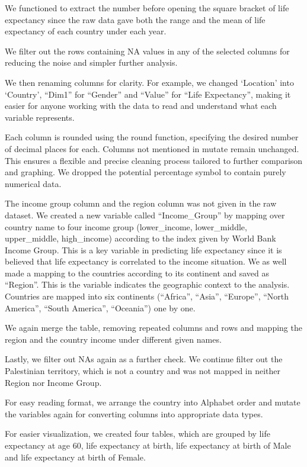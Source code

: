 \documentclass[
  letterpaper,
  DIV=11,
  numbers=noendperiod]{scrartcl}
\begin{document}
We functioned to extract the number before opening the square bracket of
life expectancy since the raw data gave both the range and the mean of
life expectancy of each country under each year.

We filter out the rows containing NA values in any of the selected
columns for reducing the noise and simpler further analysis.

We then renaming columns for clarity. For example, we changed `Location'
into `Country', ``Dim1'' for ``Gender'' and ``Value'' for ``Life
Expectancy'', making it easier for anyone working with the data to read
and understand what each variable represents.

Each column is rounded using the round function, specifying the desired
number of decimal places for each. Columns not mentioned in mutate
remain unchanged. This ensures a flexible and precise cleaning process
tailored to further comparison and graphing. We dropped the potential
percentage symbol to contain purely numerical data.

The income group column and the region column was not given in the raw
dataset. We created a new variable called ``Income\_Group'' by mapping
over country name to four income group (lower\_income, lower\_middle,
upper\_middle, high\_income) according to the index given by World Bank
Income Group. This is a key variable in predicting life expectancy since
it is believed that life expectancy is correlated to the income
situation. We as well made a mapping to the countries according to its
continent and saved as ``Region''. This is the variable indicates the
geographic context to the analysis. Countries are mapped into six
continents (``Africa'', ``Asia'', ``Europe'', ``North America'', ``South
America'', ``Oceania'') one by one.

We again merge the table, removing repeated columns and rows and mapping
the region and the country income under different given names.

Lastly, we filter out NAs again as a further check. We continue filter
out the Palestinian territory, which is not a country and was not mapped
in neither Region nor Income Group.

For easy reading format, we arrange the country into Alphabet order and
mutate the variables again for converting columns into appropriate data
types.

For easier visualization, we created four tables, which are grouped by
life expectancy at age 60, life expectancy at birth, life expectancy at
birth of Male and life expectancy at birth of Female.
\end{document}
